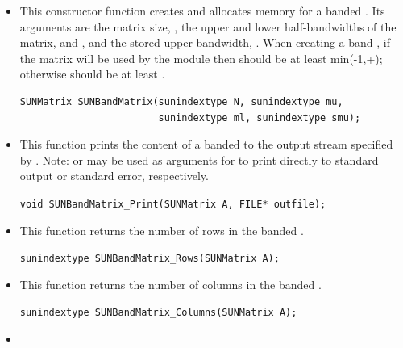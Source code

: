 \begin{itemize}


\item {}

  This constructor function creates and allocates memory for a banded .
  Its arguments are the matrix size, , the upper and lower
  half-bandwidths of the matrix,  and , and the stored
  upper bandwidth, .  When creating a band , if
  the matrix will be used by the {\sunlinsolband} module then 
  should be at least min(-1,+); otherwise 
  should be at least .  

  \begin{verbatim}
SUNMatrix SUNBandMatrix(sunindextype N, sunindextype mu,
                        sunindextype ml, sunindextype smu);
  \end{verbatim}


\item {}

  This function prints the content of a banded  to the
  output stream specified by .  Note: 
  or  may be used as arguments for  to print
  directly to standard output or standard error, respectively.
 
  \verb|void SUNBandMatrix_Print(SUNMatrix A, FILE* outfile);|


\item {}

  This function returns the number of rows in the banded .
 
  \verb|sunindextype SUNBandMatrix_Rows(SUNMatrix A);|


\item {}

  This function returns the number of columns in the banded .
 
  \verb|sunindextype SUNBandMatrix_Columns(SUNMatrix A);|


\item {}


\end{itemize}

